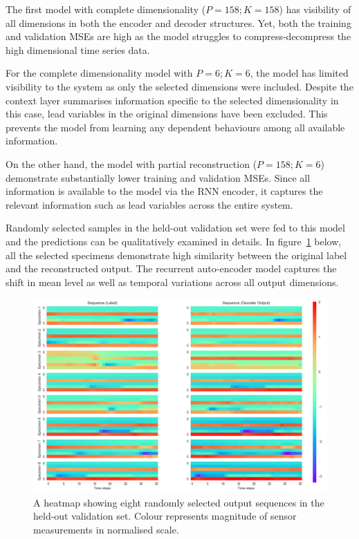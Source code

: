 \documentclass[runningheads]{llncs}
\begin{document}
The first model with complete dimensionality (\(P=158; K=158\)) has visibility of all dimensions in both the encoder and decoder structures. Yet, both the training and validation MSEs are high as the model struggles to compress-decompress the high dimensional time series data.

For the complete dimensionality model with \(P=6; K=6\), the model has limited visibility to the system as only the selected dimensions were included. Despite the context layer summarises information specific to the selected dimensionality in this case, lead variables in the original dimensions have been excluded. This prevents the model from learning any dependent behaviours among all available information.

On the other hand, the model with partial reconstruction (\(P=158; K=6\)) demonstrate substantially lower training and validation MSEs. Since all information is available to the model via the RNN encoder, it captures the relevant information such as lead variables across the entire system. 

Randomly selected samples in the held-out validation set were fed to this model and the predictions can be qualitatively examined in details. In figure~\ref{fig:heatmaps} below, all the selected specimens demonstrate high similarity between the original label and the reconstructed output. The recurrent auto-encoder model captures the shift in mean level as well as temporal variations across all output dimensions. 

\begin{figure}[H]
	\centering
	\includegraphics[width=.8\textwidth]{heatmaps.png}
	\caption{A heatmap showing eight randomly selected output sequences in the held-out validation set. Colour represents magnitude of sensor measurements in normalised scale.}
	\label{fig:heatmaps}
\end{figure}
\end{document}

